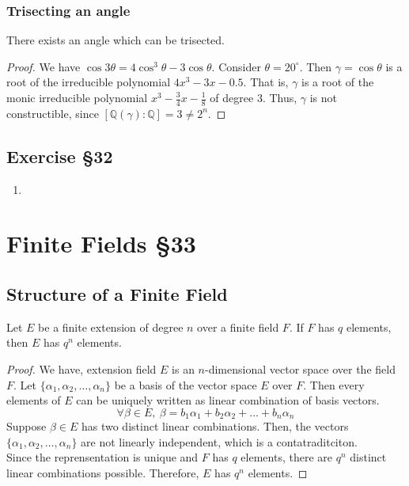 \subsubsection{Trisecting an angle}
\begin{theorem}
	There exists an angle which can be trisected.
\end{theorem}
\begin{proof}
	We have $\cos 3\theta = 4\cos^3 \theta - 3\cos \theta$.
	Consider $\theta = 20^\circ$.
	Then $\gamma = \cos \theta$ is a root of the irreducible polynomial $4x^3-3x-0.5$.
	That is, $\gamma$ is a root of the monic irreducible polynomial $x^3-\frac{3}{4}x-\frac{1}{8}$ of degree $3$.
	Thus, $\gamma$ is not constructible, since $[\mathbb{Q}(\gamma) : \mathbb{Q}] = 3 \ne 2^n$.
\end{proof}
\subsection{Exercise \S32}
\begin{enumerate}
	\item
\end{enumerate}

\section{Finite Fields \S33}
\subsection{Structure of a Finite Field}
\begin{theorem}
	Let $E$ be a finite extension of degree $n$ over a finite field $F$.
	If $F$ has $q$ elements, then $E$ has $q^n$ elements.
\end{theorem}
\begin{proof}
	We have, extension field $E$ is an $n$-dimensional vector space over the field $F$.
	Let $\{ \alpha_1, \alpha_2,\dots, \alpha_n \}$ be a basis of the vector space $E$ over $F$.
	Then every elements of $E$ can be uniquely written as linear combination of basis vectors.
\begin{equation*}
 	\forall \beta \in E,\ \beta = b_1 \alpha_1 + b_2 \alpha_2 + \dots + b_n \alpha_n
\end{equation*}
	Suppose $\beta \in E$ has two distinct linear combinations.
	Then, the vectors $\{ \alpha_1, \alpha_2,\dots,\alpha_n\}$ are not linearly independent, which is a contatraditciton.\\
	
	Since the reprensentation is unique and $F$ has $q$ elements, there are $q^n$ distinct linear combinations possible.
	Therefore, $E$ has $q^n$ elements.
\end{proof}

